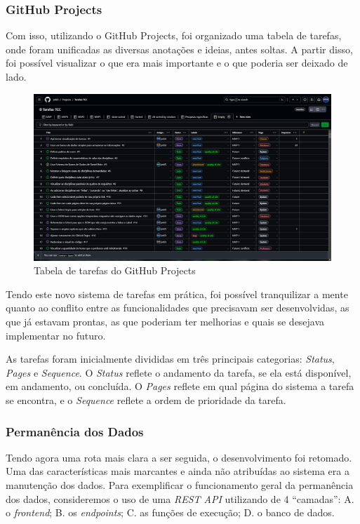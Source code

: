 \subsubsection{GitHub Projects}

Com isso, utilizando o GitHub Projects, foi organizado uma tabela de tarefas, onde foram unificadas as diversas anotações e ideias, antes soltas. A partir disso, foi possível visualizar o que era mais importante e o que poderia ser deixado de lado.

\begin{figure}[htbp]
  \centering
  \caption{Tabela de tarefas do GitHub Projects\label{fig:GitHubProjectsTable}}
  \includegraphics[scale=0.3]{files/img/Codificacao/GitHubProjects - Table.png}
  \legend{\selfAuthor}
\end{figure}

Tendo este novo sistema de tarefas em prática, foi possível tranquilizar a mente quanto ao conflito entre as funcionalidades que precisavam ser desenvolvidas, as que já estavam prontas, as que poderiam ter melhorias e quais se desejava implementar no futuro.

As tarefas foram inicialmente divididas em três principais categorias: \textit{Status}, \textit{Pages} e \textit{Sequence}. O \textit{Status} reflete o andamento da tarefa, se ela está disponível, em andamento, ou concluída. O \textit{Pages} reflete em qual página do sistema a tarefa se encontra, e o \textit{Sequence} reflete a ordem de prioridade da tarefa.

\subsubsection{Permanência dos Dados}

Tendo agora uma rota mais clara a ser seguida, o desenvolvimento foi retomado. Uma das características mais marcantes e ainda não atribuídas ao sistema era a manutenção dos dados. Para exemplificar o funcionamento geral da permanência dos dados, consideremos o uso de uma \textit{REST API} utilizando de 4 ``camadas'': A. o \textit{frontend}; B. os \textit{endpoints}; C. as funções de execução; D. o banco de dados.

